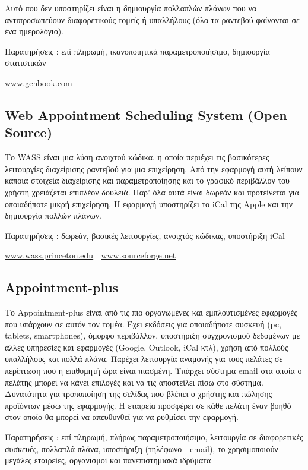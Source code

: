 Αυτό που δεν υποστηρίζει είναι η δημιουργία πολλαπλών πλάνων που να αντιπροσωπεύουν διαφορετικούς τομείς ή υπαλλήλους (όλα τα ραντεβού φαίνονται σε ένα ημερολόγιο).

Παρατηρήσεις : επί πληρωμή, ικανοποιητικά παραμετροποιήσιμο, δημιουργία στατιστικών

\href{http://www.genbook.com}{www.genbook.com}

\subsection{Web Appointment Scheduling System (Open Source)}
Το WASS είναι μια λύση ανοιχτού κώδικα, η οποία περιέχει τις βασικότερες λειτουργίες διαχείρισης ραντεβού για μια επιχείρηση. Από την εφαρμογή αυτή λείπουν κάποια στοιχεία διαχείρισης και παραμετροποίησης και το γραφικό περιβάλλον του χρήστη χρειάζεται επιπλέον δουλειά. Παρ' όλα αυτά είναι δωρεάν και προτείνεται για οποιαδήποτε μικρή επιχείρηση. Η εφαρμογή υποστηρίζει το iCal της Apple και την δημιουργία πολλών πλάνων.

Παρατηρήσεις : δωρεάν, βασικές λειτουργίες, ανοιχτός κώδικας, υποστήριξη iCal

\href{https://wass.princeton.edu/pages/login.page.php}{www.wass.princeton.edu} |
\href{http://sourceforge.net/projects/wass/}{www.sourceforge.net}

\subsection{Appointment-plus}
Το Appointment-plus είναι από τις πιο οργανωμένες και εμπλουτισμένες εφαρμογές που υπάρχουν σε αυτόν τον τομέα. Έχει εκδόσεις για οποιαδήποτε συσκευή (pc, tablets, smartphones), όμορφο περιβάλλον, υποστήριξη συγχρονισμού δεδομένων με άλλες υπηρεσίες και εφαρμογές (Google, Outlook, iCal κτλ), χρήση από πολλούς υπαλλήλους και πολλά πλάνα. Παρέχει λειτουργία αναμονής για τους πελάτες σε περίπτωση που η επιθυμητή ώρα είναι πιασμένη. Υπάρχει σύστημα email στα οποία ο πελάτης μπορεί να κάνει επιλογές και να τις αποστείλει πίσω στο σύστημα. Δυνατότητα για τροποποίηση της σελίδας που βλέπει ο χρήστης και πώλησης προϊόντων μέσω της εφαρμογής. Η εταιρεία προσφέρει σε κάθε πελάτη έναν βοηθό στον οποίο θα μπορεί να απευθυνθεί για να ρυθμίσει την εφαρμογή. 

Παρατηρήσεις : επί πληρωμή, πλήρως παραμετροποιήσιμο, λειτουργία σε διαφορετικές συσκευές, πολλαπλά πλάνα, υποστήριξη (τηλέφωνο - email), το χρησιμοποιούν μεγάλες εταιρείες, οργανισμοί και πανεπιστημιακά ιδρύματα

